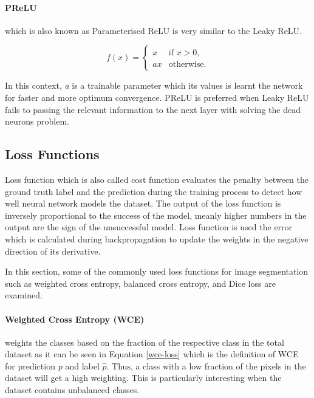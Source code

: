         \paragraph{PReLU} which is also known as Parameterised ReLU is very similar to the Leaky ReLU.

            \begin{equation}
                 f(x) = \begin{cases}
                    x & \text{if } x > 0, \\
                    a x & \text{otherwise}.
                \end{cases}
            \end{equation}

            In this context, \emph{a} is a trainable parameter which its values is learnt the network for faster and more optimum convergence.
            PReLU is preferred when Leaky ReLU fails to passing the relevant information to the next layer with solving the dead neurons problem.

    \subsection{Loss Functions}

        Loss function which is also called cost function evaluates the penalty between the ground truth label and the prediction during the training process to detect how well neural network models the dataset.
        The output of the loss function is inversely proportional to the success of the model, meanly higher numbers in the output are the sign of the unsuccessful model.
        Loss function is used the error which is calculated during backpropagation to update the weights in the negative direction of its derivative.

        In this section, some of the commonly used loss functions for image segmentation such as weighted cross entropy, balanced cross entropy, and Dice loss are examined.

        \paragraph{Weighted Cross Entropy (WCE)} weights the classes based on the fraction of the respective class in the total dataset as it can be seen in Equation \eqref{wce-loss} which is the definition of WCE for prediction \emph{p} and label $\hat{p}$.
            Thus, a class with a low fraction of the pixels in the dataset will get a high weighting. This is particularly interesting when the dataset contains unbalanced classes.

